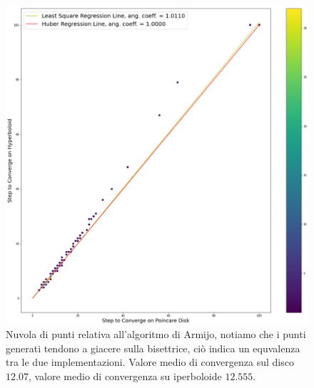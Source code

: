 \documentclass[a4paper, 12pt]{article}
\begin{document}
\begin{figure}[H] %
    \centering\includegraphics[width=1\textwidth]{armijo.png}
    \caption{Nuvola di punti relativa all'algoritmo di Armijo, notiamo che i punti generati tendono a giacere sulla bisettrice, ciò indica un equvalenza tra le due implementazioni. Valore medio di convergenza sul disco $12.07$, valore medio di convergenza su iperboloide $12.555$.}
\end{figure}
\end{document}
